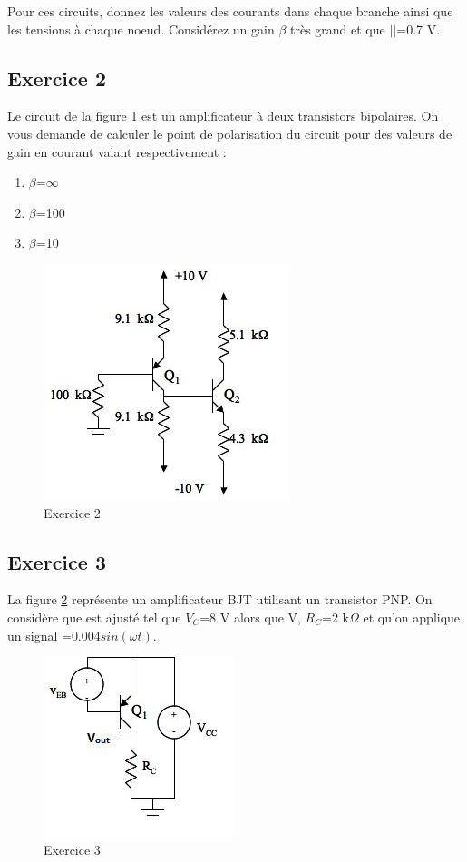 \documentclass[paper=a4, fontsize=11pt]{article} %
\numberwithin{equation}{section} %
\numberwithin{figure}{section} %
\numberwithin{table}{section} %
\begin{document}
Pour ces circuits, donnez les valeurs des courants dans chaque branche ainsi que les tensions à chaque noeud. Considérez un gain $\beta$ très grand et que $|$\vbe$|$=0.7 V.

\subsection*{Exercice 2}
Le circuit de la figure \ref{fig4-2} est un amplificateur à deux transistors bipolaires. On vous demande de calculer le point de polarisation du circuit pour des valeurs de gain en courant valant respectivement :
\begin{enumerate}
\item $\beta$=$\infty$
\item $\beta$=100
\item $\beta$=10
\end{enumerate}
\begin{figure}[!htbp]
   \centering
   \includegraphics[]{figure/fig4-2.png}
   \caption{Exercice 2}
   \label{fig4-2}
\end{figure}

\newpage
\subsection*{Exercice 3}
La figure \ref{fig4-3} représente un amplificateur BJT utilisant un transistor PNP. On considère que \veb  est ajusté tel que $V_C$=8 V alors que  V, $R_C$=2 k$\Omega$ et qu'on applique un signal \veb=$0.004 sin(\omega t)$.

\begin{figure}[!htbp]
   \centering
   \includegraphics[]{figure/fig4-3.png}
   \caption{Exercice 3}
   \label{fig4-3}
\end{figure}
\end{document}
